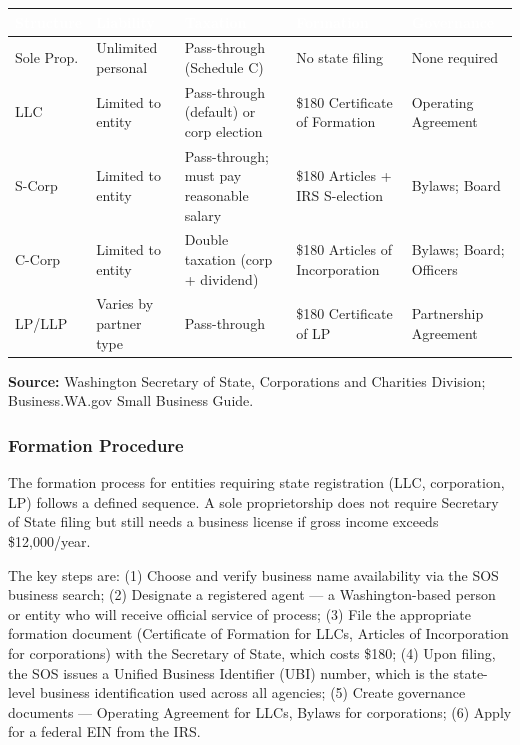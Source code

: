 \documentclass[11pt,letterpaper]{article}
\newcommand{\tableheader}[1]{\textbf{\sffamily\textcolor{white}{#1}}}
\begin{document}
\begin{center}
\begin{tabularx}{\textwidth}{L{2.5cm}L{2.5cm}L{2.5cm}L{2.5cm}X}
\toprule
{}
\tableheader{Structure} & \tableheader{Liability} & \tableheader{Taxation} & \tableheader{Formation} & \tableheader{Governance} \\
\midrule
Sole Prop. & Unlimited personal & Pass-through (Schedule C) & No state filing & None required \\
LLC & Limited to entity & Pass-through (default) or corp election & \$180 Certificate of Formation & Operating Agreement \\
S-Corp & Limited to entity & Pass-through; must pay reasonable salary & \$180 Articles + IRS S-election & Bylaws; Board \\
C-Corp & Limited to entity & Double taxation (corp + dividend) & \$180 Articles of Incorporation & Bylaws; Board; Officers \\
LP/LLP & Varies by partner type & Pass-through & \$180 Certificate of LP & Partnership Agreement \\
\bottomrule
\end{tabularx}
\end{center}

\textbf{Source:} Washington Secretary of State, Corporations and Charities Division; Business.WA.gov Small Business Guide.

\subsubsection{Formation Procedure}

The formation process for entities requiring state registration (LLC, corporation, LP) follows a defined sequence. A sole proprietorship does not require Secretary of State filing but still needs a business license if gross income exceeds \$12,000/year.

The key steps are: (1) Choose and verify business name availability via the SOS business search; (2) Designate a registered agent --- a Washington-based person or entity who will receive official service of process; (3) File the appropriate formation document (Certificate of Formation for LLCs, Articles of Incorporation for corporations) with the Secretary of State, which costs \$180; (4) Upon filing, the SOS issues a Unified Business Identifier (UBI) number, which is the state-level business identification used across all agencies; (5) Create governance documents --- Operating Agreement for LLCs, Bylaws for corporations; (6) Apply for a federal EIN from the IRS.
\end{document}
